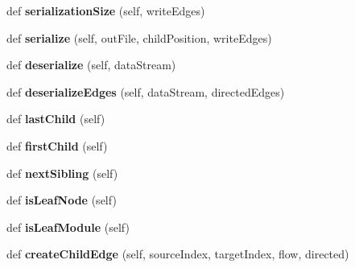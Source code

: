 \begin{DoxyCompactItemize}
\item 
\mbox{\label{classdsmacc_1_1graph_1_1infomap_1_1LeafIterator_a2df260975705480614397cc265e386d4}} 
def {\bfseries serialization\+Size} (self, write\+Edges)
\item 
\mbox{\label{classdsmacc_1_1graph_1_1infomap_1_1LeafIterator_a8f86fd167c6888fb84d4299590a28a70}} 
def {\bfseries serialize} (self, out\+File, child\+Position, write\+Edges)
\item 
\mbox{\label{classdsmacc_1_1graph_1_1infomap_1_1LeafIterator_ade5595a8e78ad5bb765c88512d1615c4}} 
def {\bfseries deserialize} (self, data\+Stream)
\item 
\mbox{\label{classdsmacc_1_1graph_1_1infomap_1_1LeafIterator_abfae630ae3b19a4faf6f50525d0d803a}} 
def {\bfseries deserialize\+Edges} (self, data\+Stream, directed\+Edges)
\item 
\mbox{\label{classdsmacc_1_1graph_1_1infomap_1_1LeafIterator_ae18e28d29083dec55d718e7bb3344740}} 
def {\bfseries last\+Child} (self)
\item 
\mbox{\label{classdsmacc_1_1graph_1_1infomap_1_1LeafIterator_ad2e83ef8991860360bc7ad6a9cbef4ab}} 
def {\bfseries first\+Child} (self)
\item 
\mbox{\label{classdsmacc_1_1graph_1_1infomap_1_1LeafIterator_ad905afd1230e9fedfe0985829f500f8d}} 
def {\bfseries next\+Sibling} (self)
\item 
\mbox{\label{classdsmacc_1_1graph_1_1infomap_1_1LeafIterator_a14d5769c4dffa9ab505f16116f22bde3}} 
def {\bfseries is\+Leaf\+Node} (self)
\item 
\mbox{\label{classdsmacc_1_1graph_1_1infomap_1_1LeafIterator_a6b1f8abea3bad62b7e65d43383f97278}} 
def {\bfseries is\+Leaf\+Module} (self)
\item 
\mbox{\label{classdsmacc_1_1graph_1_1infomap_1_1LeafIterator_a561bb2853b6101cbf0ec92f32cba34f6}} 
def {\bfseries create\+Child\+Edge} (self, source\+Index, target\+Index, flow, directed)
\end{DoxyCompactItemize}
